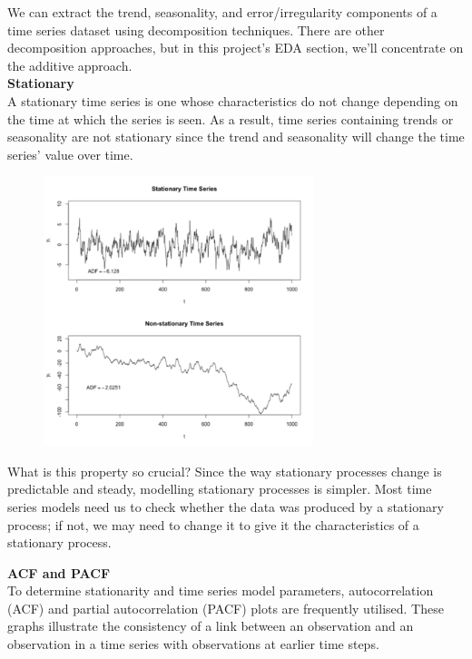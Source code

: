 \vspace{10mm}

We can extract the trend, seasonality, and error/irregularity components of a time series dataset using decomposition techniques. There are other decomposition approaches, but in this project's EDA section, we'll concentrate on the additive approach. \\

\vspace{5mm}
\textbf{Stationary} \\
A stationary time series is one whose characteristics do not change depending on the time at which the series is seen. As a result, time series containing trends or seasonality are not stationary since the trend and seasonality will change the time series' value over time.

\begin{figure}[H]
    \centering
    \includegraphics[width=0.7\textwidth]{Images/stati.png}
    \caption{}
    \label{fig1}
\end{figure}

What is this property so crucial? Since the way stationary processes change is predictable and steady, modelling stationary processes is simpler. Most time series models need us to check whether the data was produced by a stationary process; if not, we may need to change it to give it the characteristics of a stationary process.



\vspace{5mm}
\textbf{ACF and PACF} \\
To determine stationarity and time series model parameters, autocorrelation (ACF) and partial autocorrelation (PACF) plots are frequently utilised. These graphs illustrate the consistency of a link between an observation and an observation in a time series with observations at earlier time steps.

